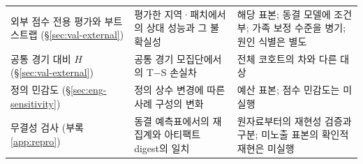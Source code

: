 \begin{table}[!t]
\begin{tabularx}{\linewidth}{@{}>{\raggedright\arraybackslash}p{3.1cm}>{\raggedright\arraybackslash}p{5.3cm}X@{}}
    외부 점수 전용 평가와 부트스트랩 (§\ref{sec:val-external}) & 평가한 지역·패치에서의 상대 성능과 그 불확실성 & 해당 표본; 동결 모델에 조건부; 가족 보정 수준을 병기; 원인 식별은 별도 \\ %
    공통 경기 대비 $H$ (§\ref{sec:val-external}) & 공통 경기 모집단에서의 T$-$S 손실차 & 전체 코호트의 차와 다른 대상 \\ %
    정의 민감도 (§\ref{sec:eng-sensitivity}) & 정의 상수 변경에 따른 사례 구성의 변화 & 예산 표본; 점수 민감도는 미실행 \\
    무결성 검사 (부록 \ref{app:repro}) & 동결 예측표에서의 재집계와 아티팩트 digest의 일치 & 원자료부터의 재현성 검증과 구분; 미노출 표본의 확인적 재현은 미실행 \\ %
    \bottomrule
  \end{tabularx}
\end{table}
